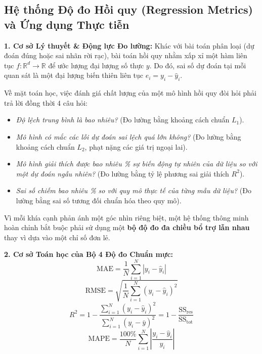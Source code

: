 \documentclass[12pt,a4paper]{report}
\begin{document}
\subsection{Hệ thống Độ đo Hồi quy (Regression Metrics) và Ứng dụng Thực tiễn}

\textbf{1. Cơ sở Lý thuyết \& Động lực Đo lường:}
Khác với bài toán phân loại (dự đoán đúng hoặc sai nhãn rời rạc), bài toán hồi quy nhằm xấp xỉ một hàm liên tục $f: \mathbb{R}^d \to \mathbb{R}$ để ước lượng đại lượng số thực $y$. Do đó, sai số dự đoán tại mỗi quan sát là một đại lượng biến thiên liên tục $e_i = y_i - \hat{y}_i$.

Về mặt toán học, việc đánh giá chất lượng của một mô hình hồi quy đòi hỏi phải trả lời đồng thời 4 câu hỏi:
\begin{itemize}[leftmargin=1.5em]
    \item \textit{Độ lệch trung bình là bao nhiêu?} (Đo lường bằng khoảng cách chuẩn $L_1$).
    \item \textit{Mô hình có mắc các lỗi dự đoán sai lệch quá lớn không?} (Đo lường bằng khoảng cách chuẩn $L_2$, phạt nặng các giá trị ngoại lai).
    \item \textit{Mô hình giải thích được bao nhiêu \% sự biến động tự nhiên của dữ liệu so với một dự đoán ngẫu nhiên?} (Đo lường bằng tỷ lệ phương sai giải thích $R^2$).
    \item \textit{Sai số chiếm bao nhiêu \% so với quy mô thực tế của từng mẫu dữ liệu?} (Đo lường bằng sai số tương đối chuẩn hóa theo quy mô).
\end{itemize}
Vì mỗi khía cạnh phản ánh một góc nhìn riêng biệt, một hệ thống thông minh hoàn chỉnh bắt buộc phải sử dụng một \textbf{bộ độ đo đa chiều bổ trợ lẫn nhau} thay vì dựa vào một chỉ số đơn lẻ.

\textbf{2. Cơ sở Toán học của Bộ 4 Độ đo Chuẩn mực:}
\begin{equation}
\text{MAE} = \frac{1}{N} \sum_{i=1}^N |y_i - \hat{y}_i|
\end{equation}
\begin{equation}
\text{RMSE} = \sqrt{\frac{1}{N} \sum_{i=1}^N (y_i - \hat{y}_i)^2}
\end{equation}
\begin{equation}
R^2 = 1 - \frac{\sum_{i=1}^N (y_i - \hat{y}_i)^2}{\sum_{i=1}^N (y_i - \bar{y})^2} = 1 - \frac{\text{SS}_{\text{res}}}{\text{SS}_{\text{tot}}}
\end{equation}
\begin{equation}
\text{MAPE} = \frac{100\%}{N} \sum_{i=1}^N \left| \frac{y_i - \hat{y}_i}{y_i} \right|
\end{equation}
\end{document}
